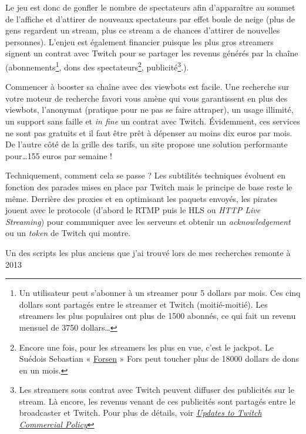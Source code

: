 \documentclass[a4paper]{article}
\begin{document}
Le jeu est donc de gonfler le nombre de spectateurs afin d'apparaître au sommet de l'affiche et d'attirer de nouveaux spectateurs par effet boule de neige (plus de gens regardent un stream, plus ce stream a de chances d'attirer de nouvelles personnes). L'enjeu est également financier puisque les plus gros streamers signent un contrat avec Twitch pour se partager les revenus générés par la chaîne (abonnements\footnote{Un utilisateur peut s'abonner à un streamer pour 5 dollars par mois. Ces cinq dollars sont partagés entre le streamer et Twitch (moitié-moitié). Les streamers les plus populaires ont plus de 1500 abonnés, ce qui fait un revenu mensuel de 3750 dollars\ldots}, dons des spectateurs\footnote{Encore une fois, pour les streamers les plus en vue, c'est le jackpot. Le Suédois Sebastian « \href{https://www.twitch.tv/forsenlol}{Forsen} » Fors peut toucher plus de 18000 dollars de dons en un mois.}, publicité\footnote{Les streamers sous contrat avec Twitch peuvent diffuser des publicités sur le stream. Là encore, les revenus venant de ces publicités sont partagés entre le broadcaster et Twitch. Pour plus de détails, voir \href{https://blog.twitch.tv/updates-to-twitch-commercial-policy-a35f5ce89afa}{\textit{Updates to Twitch Commercial Policy}}}.).

Commencer à booster sa chaîne avec des viewbots est facile. Une recherche sur votre moteur de recherche favori vous amène qui vous garantissent en plus des viewbots, l'anonymat (pratique pour ne pas se faire attraper), un usage illimité, un support sans faille et \textit{in fine} un contrat avec Twitch. Évidemment, ces services ne sont pas gratuits et il faut être prêt à dépenser au moins dix euros par mois. De l'autre côté de la grille des tarifs, un site propose une solution performante pour\ldots 155 euros par semaine ! 

Techniquement, comment cela se passe ? Les subtilités techniques évoluent en fonction des parades mises en place par Twitch mais le principe de base reste le même. Derrière des proxies et en optimisant les paquets envoyés, les pirates jouent avec le protocole (d'abord le RTMP puis le HLS ou \textit{HTTP Live Streaming}) pour communiquer avec les serveurs et obtenir un \textit{acknowledgement} ou un \textit{token} de Twitch qui montre. 


Un des scripts les plus anciens que j'ai trouvé lors de mes recherches remonte à 2013 %
\end{document}
